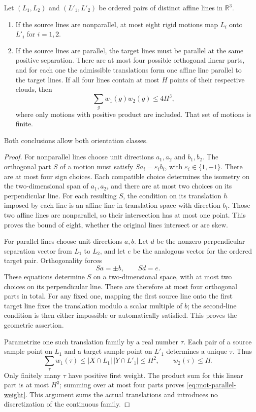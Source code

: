 \begin{lemma}
\label{lem:mot-line-images}
Let $(L_1,L_2)$ and $(L'_1,L'_2)$ be ordered pairs of distinct affine lines in $\mathbb{R}^3$.
\begin{enumerate}
\item If the source lines are nonparallel, at most eight rigid
motions map $L_i$ onto $L'_i$ for $i=1,2$.
\item If the source lines are parallel, the target lines must be
parallel at the same positive separation.  There are at most four possible orthogonal linear parts, and for each one the admissible translations form one affine line parallel to the target lines. If all four lines contain at most $H$ points of their respective clouds, then
\begin{equation}
\label{eq:mot-parallel-weight}
 \sum_g w_1(g)w_2(g)\le4H^3,
\end{equation}
where only motions with positive product are included.  That set of motions is finite.
\end{enumerate}
Both conclusions allow both orientation classes.
\end{lemma}

\begin{proof}
For nonparallel lines choose unit directions $a_1,a_2$ and $b_1,b_2$.  The orthogonal part $S$ of a motion must satisfy $Sa_i=\varepsilon_i b_i$, with $\varepsilon_i\in\{1,-1\}$.  There are at most four sign choices.  Each compatible choice determines the isometry on the two-dimensional span of $a_1,a_2$, and there are at most two choices on its perpendicular line.  For each resulting $S$, the condition on its translation $h$ imposed by each line is an affine line in translation space with direction $b_i$. Those two affine lines are nonparallel, so their intersection has at most one point.  This proves the bound of eight, whether the original lines intersect or are skew.

For parallel lines choose unit directions $a,b$.  Let $d$ be the nonzero perpendicular separation vector from $L_1$ to $L_2$, and let $e$ be the analogous vector for the ordered target pair.  Orthogonality forces
\[
 Sa=\pm b,\qquad Sd=e.
\]
These equations determine $S$ on a two-dimensional space, with at most two choices on its perpendicular line.  There are therefore at most four orthogonal parts in total.  For any fixed one, mapping the first source line onto the first target line fixes the translation modulo a scalar multiple of $b$; the second-line condition is then either impossible or automatically satisfied.  This proves the geometric assertion.

Parametrize one such translation family by a real number $\tau$. Each pair of a source sample point on $L_1$ and a target sample point on $L'_1$ determines a unique $\tau$.  Thus
\[
 \sum_\tau w_1(\tau)
 \le |X\cap L_1|\,|Y\cap L'_1|\le H^2,
 \qquad w_2(\tau)\le H.
\]
Only finitely many $\tau$ have positive first weight.  The product sum for this linear part is at most $H^3$; summing over at most four parts proves \eqref{eq:mot-parallel-weight}.  This argument sums the actual translations and introduces no discretization of the continuous family.
\end{proof}

